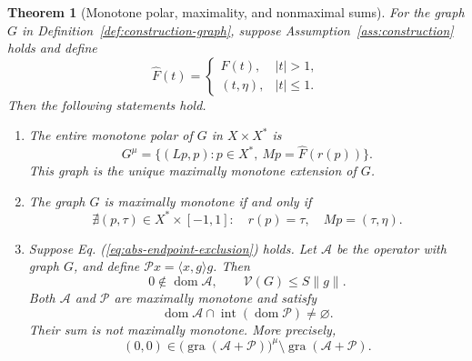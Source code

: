 \documentclass[11pt]{article}
\newcommand{\gra}{\operatorname{gra}}
\newcommand{\dom}{\operatorname{dom}}
\newcommand{\pair}[2]{\langle #1,#2\rangle}
\newtheorem{theorem}{Theorem}
\theoremstyle{definition}
\theoremstyle{remark}
\begin{document}
\begin{theorem}[Monotone polar, maximality, and nonmaximal sums]
\label{thm:endpoint-criterion}
For the graph $G$ in Definition~\ref{def:construction-graph}, suppose Assumption~\ref{ass:construction} holds and define
\[
\widehat F(t)=
\begin{cases}
F(t),&|t|>1,\\
(t,\eta),&|t|\le1.
\end{cases}
\]
Then the following statements hold.
\begin{enumerate}
\renewcommand{\theenumi}{\roman{enumi}}
\renewcommand{\labelenumi}{(\theenumi)}
\item\label{thm:polar-part} The entire monotone polar of $G$ in $X\times X^*$ is
\begin{equation}
G^\mu=\{(Lp,p):p\in X^*,\ Mp=\widehat F(r(p))\}.
\label{eq:abs-entire-polar}
\end{equation}
This graph is the unique maximally monotone extension of $G$.

\item\label{thm:maximality-part} The graph $G$ is maximally monotone if and only if
\begin{equation}
\nexists(p,\tau)\in X^*\times[-1,1]:
\quad r(p)=\tau,\quad Mp=(\tau,\eta).
\label{eq:abs-endpoint-exclusion}
\end{equation}

\item\label{thm:sum-part} Suppose Eq. (\ref{eq:abs-endpoint-exclusion}) holds.
Let $\mathcal A$ be the operator with graph $G$, and define $\mathcal P x=\pair{x}{g}g$. Then
\[
0\notin\dom\mathcal A,\qquad \mathcal V(G)\le S\|g\|.
\]
Both $\mathcal A$ and $\mathcal P$ are maximally monotone and satisfy
\[
\dom\mathcal A\cap\operatorname{int}(\dom\mathcal P)\ne\varnothing.
\]
Their sum is not maximally monotone. More precisely,
\[
(0,0)\in
\bigl(\gra(\mathcal A+\mathcal P)\bigr)^\mu
\setminus\gra(\mathcal A+\mathcal P).
\]
\end{enumerate}
\end{theorem}
\end{document}
